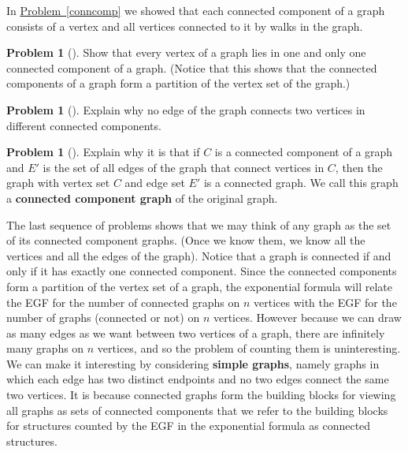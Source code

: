 \documentclass[10pt,]{book}
\newcommand{\terminology}[1]{\textbf{#1}}
\theoremstyle{plain}
\theoremstyle{definition}
\newtheorem{activity}[project]{Problem}
\theoremstyle{definition}
\numberwithin{equation}{chapter}
\begin{document}
%
\par
In \hyperref[conncomp]{Problem~\ref{conncomp}} we showed that each connected component of a graph consists of a vertex and all vertices connected to it by walks in the graph.%
\begin{activity}[] \label{activity-418}
Show that every vertex of a graph lies in one and only one connected component of a graph. (Notice that this shows that the connected components of a graph form a partition of the vertex set of the graph.)%
\end{activity}
\begin{activity}[] \label{activity-419}
Explain why no edge of the graph connects two vertices in different connected components.%
\end{activity}
\begin{activity}[] \label{activity-420}
Explain why it is that if \(C\) is a connected component of a graph and \(E'\) is the set of all edges of the graph that connect vertices in \(C\), then the graph with vertex set \(C\) and edge set \(E'\) is a connected graph. We call this graph a \terminology{connected component graph} of the original graph.%
\end{activity}
The last sequence of problems shows that we may think of any graph as the set of its connected component graphs. (Once we know them, we know all the vertices and all the edges of the graph). Notice that a graph is connected if and only if it has exactly one connected component. Since the connected components form a partition of the vertex set of a graph, the exponential formula will relate the EGF for the number of connected graphs on \(n\) vertices with the EGF for the number of graphs (connected or not) on \(n\) vertices. However because we can draw as many edges as we want between two vertices of a graph, there are infinitely many graphs on \(n\) vertices, and so the problem of counting them is uninteresting. We can make it interesting by considering \terminology{simple graphs}, namely graphs in which each edge has two distinct endpoints and no two edges connect the same two vertices. It is because connected graphs form the building blocks for viewing all graphs as sets of connected components that we refer to the building blocks for structures counted by the EGF in the exponential formula as connected structures.%
\end{document}
